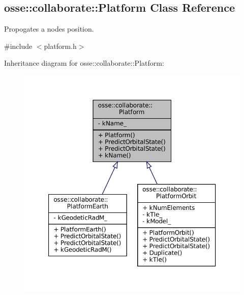 \hypertarget{classosse_1_1collaborate_1_1_platform}{}\subsection{osse\+:\+:collaborate\+:\+:Platform Class Reference}
\label{classosse_1_1collaborate_1_1_platform}


Propogates a node\textquotesingle{}s position.  




{\ttfamily \#include $<$platform.\+h$>$}



Inheritance diagram for osse\+:\+:collaborate\+:\+:Platform\+:
\nopagebreak
\begin{figure}[H]
\begin{center}
\leavevmode
\includegraphics[width=350pt]{classosse_1_1collaborate_1_1_platform__inherit__graph}
\end{center}
\end{figure}

